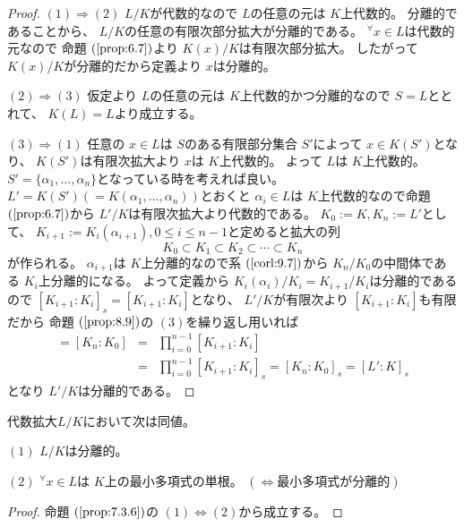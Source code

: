 \documentclass[../master_galois_theory]{subfiles}
\begin{document}
\begin{proof}
  $(1) \Rightarrow (2)$
  $L/K$が代数的なので $L$の任意の元は $K$上代数的。
  分離的であることから、 $L/K$の任意の有限次部分拡大が分離的である。
  ${}^\forall x \in L$は代数的元なので
  命題 $(\mathrm{\ref{prop:6.7}})$より $K(x)/K$は有限次部分拡大。
  したがって $K(x)/K$が分離的だから定義より $x$は分離的。

  $(2) \Rightarrow (3)$
  仮定より $L$の任意の元は $K$上代数的かつ分離的なので
  $S = L$ととれて、 $K(L) = L$より成立する。

  $(3) \Rightarrow (1)$
  任意の $x \in L$は $S$のある有限部分集合 $S'$によって
  $x \in K(S')$となり、 $K(S')$は有限次拡大より $x$は $K$上代数的。
  よって $L$は $K$上代数的。
  $S' = \{ \alpha_1 , \dots , \alpha_n \}$となっている時を考えれば良い。
  $L' = K(S') (= K(\alpha_1 , \dots , \alpha_n))$とおくと $\alpha_i \in L$は $K$上代数的なので命題 $(\mathrm{\ref{prop:6.7}})$から
  $L'/K$は有限次拡大より代数的である。
  $K_0 := K , K_n := L'$として、 $K_{i+1} := K_i(\alpha_{i+1}) , 0 \leq i \leq n-1$と定めると拡大の列
  \[
  K_0 \subset K_1 \subset K_2 \subset \cdots \subset K_n
  \]
  が作られる。
  $\alpha_{i+1}$は $K$上分離的なので系 $(\mathrm{\ref{corl:9.7}})$から
  $K_n/K_0$の中間体である $K_i$上分離的になる。
  よって定義から $K_i(\alpha_i)/K_i = K_{i+1}/K_i$は分離的であるので
  $[K_{i+1}:K_i]_s = [K_{i+1}:K_i]$となり、
  $L'/K$が有限次より $[K_{i+1}:K_i]$も有限だから
  命題 $(\mathrm{\ref{prop:8.9}})$の $(3)$を繰り返し用いれば
  \begin{eqnarray*}
    [L':K] = [K_n:K_0] & = & \prod_{i=0}^{n-1} [K_{i+1}:K_i] \\
    & = & \prod_{i=0}^{n-1} [K_{i+1}:K_i]_s = [K_n:K_0]_s = [L':K]_s
  \end{eqnarray*}
  となり $L'/K$は分離的である。
\end{proof}

\begin{corl} \label{corl:separable}
  代数拡大$L/K$において次は同値。

  $(1)$
  $L/K$は分離的。

  $(2)$
  ${}^\forall x \in L$は $K$上の最小多項式の単根。 $(\Leftrightarrow 最小多項式が分離的)$
\end{corl}

\begin{proof}
  命題 $(\mathrm{\ref{prop:7.3.6}})$の $(1) \Leftrightarrow (2)$から成立する。
\end{proof}
\end{document}
